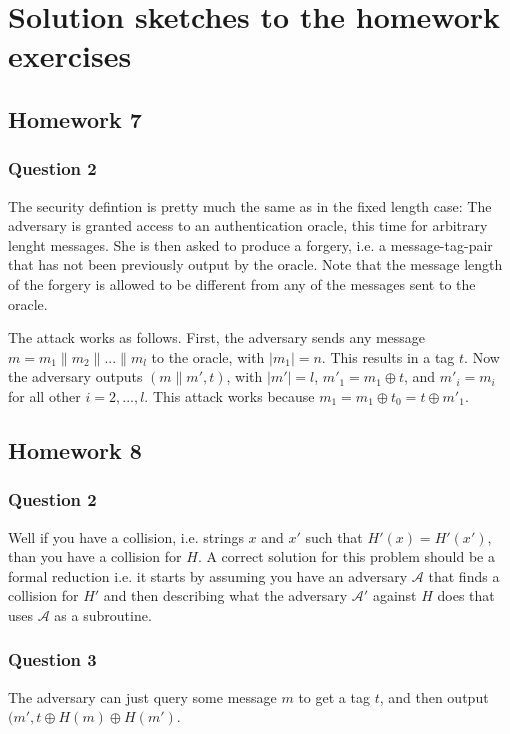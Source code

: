 \documentclass{article}
\numberwithin{defn}{section}
\numberwithin{equation}{section}
\begin{document}
\section*{Solution sketches to the homework exercises}

\subsection*{Homework 7}


	\subsubsection*{Question 2} The security defintion is pretty much the same as in the fixed length case: The adversary is granted access to an authentication oracle, this time for arbitrary lenght messages. She is then asked to produce a forgery, i.e. a message-tag-pair that has not been previously output by the oracle. Note that the message length of the forgery is allowed to be different from any of the messages sent to the oracle.
	
	The attack works as follows. First, the adversary sends any message $m=m_1\|m_2\|...\|m_l$ to the oracle, with $|m_1|=n$. This results in a tag $t$. Now the adversary outputs $(m\|m', t)$, with $|m'|=l$, $m'_1=m_1 \oplus t$, and $m'_i=m_i$ for all other $i=2,...,l$. This attack works because $m_1=m_1\oplus t_0=t\oplus m'_1$.
	

\subsection*{Homework 8}

	\subsubsection*{Question 2}
	Well if you have a collision, i.e. strings $x$ and $x'$ such that $H'(x)=H'(x')$, than you have a collision for $H$. A correct solution for this problem should be a formal reduction i.e. it starts by assuming you have an adversary $\mathcal{A}$ that finds a collision for $H'$ and then describing what the adversary $\mathcal{A}'$ against $H$ does that uses $\mathcal{A}$ as a subroutine.
	
	\subsubsection*{Question 3}
	The adversary can just query some message $m$ to get a tag $t$, and then output $(m', t\oplus H(m)\oplus H(m')$.
	
\end{document}
